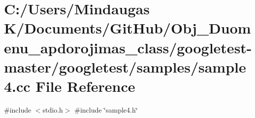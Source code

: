 \hypertarget{googletest-master_2googletest_2samples_2sample4_8cc}{}\section{C\+:/\+Users/\+Mindaugas K/\+Documents/\+Git\+Hub/\+Obj\+\_\+\+Duomenu\+\_\+apdorojimas\+\_\+class/googletest-\/master/googletest/samples/sample4.cc File Reference}
\label{googletest-master_2googletest_2samples_2sample4_8cc}
{\ttfamily \#include $<$stdio.\+h$>$}\newline
{\ttfamily \#include \char`\"{}sample4.\+h\char`\"{}}\newline
